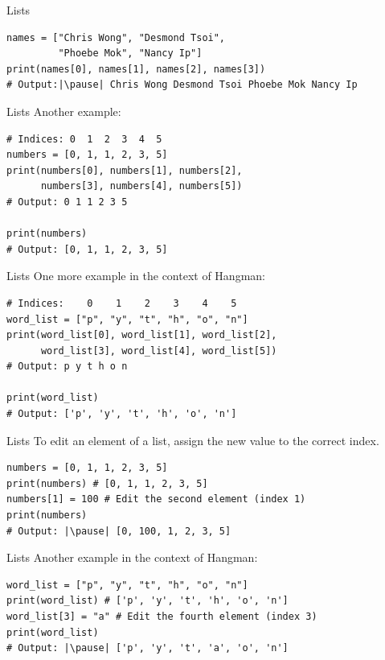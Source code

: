\documentclass[dvipsnames, svgnames, x11names]{beamer}
\begin{document}
\begin{frame}[fragile]{Lists}
\begin{verbatim}
names = ["Chris Wong", "Desmond Tsoi",
         "Phoebe Mok", "Nancy Ip"]
print(names[0], names[1], names[2], names[3]) 
# Output:|\pause| Chris Wong Desmond Tsoi Phoebe Mok Nancy Ip
\end{verbatim}
\end{frame}

\begin{frame}[fragile]{Lists}
Another example:
\begin{verbatim}
# Indices: 0  1  2  3  4  5
numbers = [0, 1, 1, 2, 3, 5]
print(numbers[0], numbers[1], numbers[2],
      numbers[3], numbers[4], numbers[5]) 
# Output: 0 1 1 2 3 5

print(numbers)
# Output: [0, 1, 1, 2, 3, 5]
\end{verbatim}
\end{frame}

\begin{frame}[fragile]{Lists}
One more example in the context of Hangman:
\begin{verbatim}
# Indices:    0    1    2    3    4    5
word_list = ["p", "y", "t", "h", "o", "n"]
print(word_list[0], word_list[1], word_list[2],
      word_list[3], word_list[4], word_list[5]) 
# Output: p y t h o n

print(word_list)
# Output: ['p', 'y', 't', 'h', 'o', 'n']
\end{verbatim}
\end{frame}

\begin{frame}[fragile]{Lists}
To edit an element of a list, assign the new value to the correct index. \pause
\begin{verbatim}
numbers = [0, 1, 1, 2, 3, 5]
print(numbers) # [0, 1, 1, 2, 3, 5]
numbers[1] = 100 # Edit the second element (index 1)
print(numbers)  
# Output: |\pause| [0, 100, 1, 2, 3, 5]
\end{verbatim}
\end{frame}

\begin{frame}[fragile]{Lists}
Another example in the context of Hangman:
\begin{verbatim}
word_list = ["p", "y", "t", "h", "o", "n"]
print(word_list) # ['p', 'y', 't', 'h', 'o', 'n']
word_list[3] = "a" # Edit the fourth element (index 3)
print(word_list)  
# Output: |\pause| ['p', 'y', 't', 'a', 'o', 'n']
\end{verbatim}
\end{frame}
\end{document}
